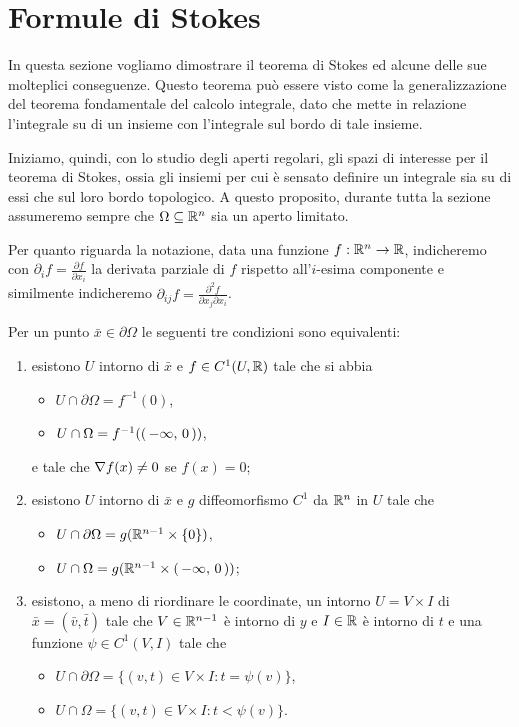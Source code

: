 \section{Formule di Stokes}\label{sezione:FormuleStokes}

In questa sezione vogliamo dimostrare il teorema di Stokes ed alcune delle sue molteplici conseguenze. Questo teorema può essere visto come la generalizzazione del teorema fondamentale del calcolo integrale, dato che mette in relazione l'integrale su di un insieme con l'integrale sul bordo di tale insieme.

Iniziamo, quindi, con lo studio degli aperti regolari, gli spazi di interesse per il teorema di Stokes, ossia gli insiemi per cui è sensato definire un integrale sia su di essi che sul loro bordo topologico. A questo proposito, durante tutta la sezione assumeremo sempre che $\Omega\subseteq\mathbb R^n$ sia un aperto limitato.

Per quanto riguarda la notazione, data una funzione $f:\mathbb R^n\to \mathbb R$, indicheremo con $\partial_i f=\frac{\partial f}{\partial x_i}$ la derivata parziale di $f$ rispetto all'$i$-esima componente e similmente indicheremo $\partial_{ij}f=\frac{\partial^2 f}{\partial x_j\partial x_i}$. 

\begin{theorem}\label{thm:PtRegEquiv}
	Per un punto $\bar x\in \partial \Omega$ le seguenti tre condizioni sono equivalenti:
	\begin{enumerate}
		\item esistono $U$ intorno di $\bar x$ e $f\in C^1(U,\mathbb R)$ tale che si abbia
			\begin{itemize}
				\item $U\cap \partial \Omega=f^{-1}(0)$,
				\item $U\cap \Omega=f^{-1}(\left(\,-\infty,\,0\,\right))$,
			\end{itemize}
			e tale che $\nabla f(x)\neq 0$ se $f(x)=0$;\label{PRE:i}
		\item esistono $U$ intorno di $\bar x$ e $g$ diffeomorfismo $C^1$ da $\mathbb R^n$ in $U$ tale che\label{PRE:ii}
			\begin{itemize}
				\item $U\cap \partial \Omega = g(\mathbb R^{n-1}\times\{0\})$,
				\item $U\cap \Omega = g(\mathbb R^{n-1}\times\left(\,-\infty,\,0\,\right))$;
			\end{itemize}
		\item esistono, a meno di riordinare le coordinate, un intorno $U=V\times I$ di $\bar x=(\bar v,\bar t)$ tale che $V\in\mathbb R^{n-1}$ è intorno di $y$
			e $I\in\mathbb R$ è intorno di $t$ e una funzione $\psi\in C^1(V,I)$ tale che
			\begin{itemize}
				\item $U\cap \partial \Omega = \{(v,t)\in V\times I: t=\psi(v)\}$,
				\item $U\cap \Omega = \{(v,t)\in V\times I:t<\psi(v)\}$.
			\end{itemize}\label{PRE:iii}
	\end{enumerate}
\end{theorem}

